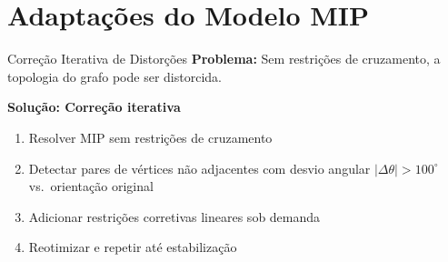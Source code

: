 \documentclass{beamer}
\begin{document}
\section{Adaptações do Modelo MIP}

\begin{frame}[plain]
  \sectionpage
\end{frame}

\begin{frame}{Correção Iterativa de Distorções}
  \textbf{Problema:} Sem restrições de cruzamento, a topologia do grafo pode ser distorcida.

  \vspace{0.2cm}
  \textbf{Solução: Correção iterativa}
  \begin{enumerate}
    \item Resolver MIP sem restrições de cruzamento
    \item Detectar pares de vértices não adjacentes com desvio angular $|\Delta\theta| > 100^\circ$ vs.\ orientação original
    \item Adicionar restrições corretivas lineares sob demanda
    \item Reotimizar e repetir até estabilização
  \end{enumerate}

\end{frame}
\end{document}
